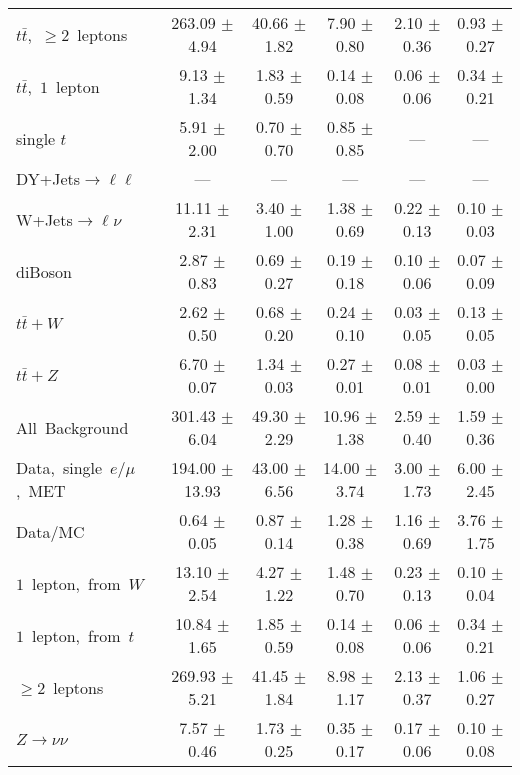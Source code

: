 \documentclass{article}
\begin{document}
\begin{longtable}{|l|c|c|c|c|c|}
$t\bar{t}$,~$\ge2$~leptons & 263.09 $\pm$ 4.94  & 40.66 $\pm$ 1.82  & 7.90 $\pm$ 0.80  & 2.10 $\pm$ 0.36  & 0.93 $\pm$ 0.27 \\* 
$t\bar{t}$,~$1$~lepton & 9.13 $\pm$ 1.34  & 1.83 $\pm$ 0.59  & 0.14 $\pm$ 0.08  & 0.06 $\pm$ 0.06  & 0.34 $\pm$ 0.21 \\* 
single $t$  & 5.91 $\pm$ 2.00  & 0.70 $\pm$ 0.70  & 0.85 $\pm$ 0.85  & ---  & --- \\* 
DY+Jets$\rightarrow\ell\ell$  & ---  & ---  & ---  & ---  & --- \\* 
W+Jets$\rightarrow\ell\nu$  & 11.11 $\pm$ 2.31  & 3.40 $\pm$ 1.00  & 1.38 $\pm$ 0.69  & 0.22 $\pm$ 0.13  & 0.10 $\pm$ 0.03 \\* 
diBoson  & 2.87 $\pm$ 0.83  & 0.69 $\pm$ 0.27  & 0.19 $\pm$ 0.18  & 0.10 $\pm$ 0.06  & 0.07 $\pm$ 0.09 \\* 
$t\bar{t}+W$  & 2.62 $\pm$ 0.50  & 0.68 $\pm$ 0.20  & 0.24 $\pm$ 0.10  & 0.03 $\pm$ 0.05  & 0.13 $\pm$ 0.05 \\* 
$t\bar{t}+Z$  & 6.70 $\pm$ 0.07  & 1.34 $\pm$ 0.03  & 0.27 $\pm$ 0.01  & 0.08 $\pm$ 0.01  & 0.03 $\pm$ 0.00 \\* 
\hline \hline 
All~Background  & 301.43 $\pm$ 6.04  & 49.30 $\pm$ 2.29  & 10.96 $\pm$ 1.38  & 2.59 $\pm$ 0.40  & 1.59 $\pm$ 0.36 \\* 
Data,~single~$e/\mu$,~MET  & 194.00 $\pm$ 13.93  & 43.00 $\pm$ 6.56  & 14.00 $\pm$ 3.74  & 3.00 $\pm$ 1.73  & 6.00 $\pm$ 2.45 \\* 
Data/MC  & 0.64 $\pm$ 0.05  & 0.87 $\pm$ 0.14  & 1.28 $\pm$ 0.38  & 1.16 $\pm$ 0.69  & 3.76 $\pm$ 1.75 \\* 
\hline \hline 
$1$~lepton,~from~$W$  & 13.10 $\pm$ 2.54  & 4.27 $\pm$ 1.22  & 1.48 $\pm$ 0.70  & 0.23 $\pm$ 0.13  & 0.10 $\pm$ 0.04 \\* 
$1$~lepton,~from~$t$  & 10.84 $\pm$ 1.65  & 1.85 $\pm$ 0.59  & 0.14 $\pm$ 0.08  & 0.06 $\pm$ 0.06  & 0.34 $\pm$ 0.21 \\* 
$\ge2$~leptons  & 269.93 $\pm$ 5.21  & 41.45 $\pm$ 1.84  & 8.98 $\pm$ 1.17  & 2.13 $\pm$ 0.37  & 1.06 $\pm$ 0.27 \\* 
$Z\rightarrow\nu\nu$  & 7.57 $\pm$ 0.46  & 1.73 $\pm$ 0.25  & 0.35 $\pm$ 0.17  & 0.17 $\pm$ 0.06  & 0.10 $\pm$ 0.08 \\* 
\hline 
\end{longtable} 

 
 
 
 
\pagebreak 

 
 
\end{document}
